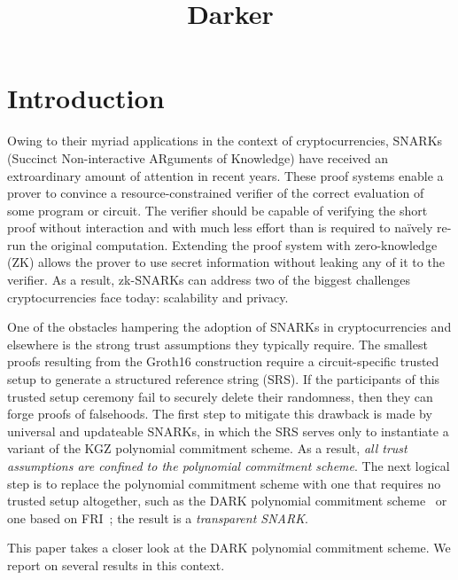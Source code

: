 \documentclass[12pt]{article}
\title{Darker}
\theoremstyle{Definition}
\begin{document}
	
\maketitle
\section{Introduction}
Owing to their myriad applications in the context of cryptocurrencies, SNARKs (Succinct Non-interactive ARguments of Knowledge) have received an extroardinary amount of attention in recent years. These proof systems enable a prover to convince a resource-constrained verifier of the correct evaluation of some program or circuit. The verifier should be capable of verifying the short proof without interaction and with much less effort than is required to naïvely re-run the original computation. Extending the proof system with zero-knowledge (ZK) allows the prover to use secret information without leaking any of it to the verifier. As a result, zk-SNARKs can address two of the biggest challenges cryptocurrencies face today: scalability and privacy.

One of the obstacles hampering the adoption of SNARKs in cryptocurrencies and elsewhere is the strong trust assumptions they typically require. The smallest proofs resulting from the Groth16 construction require a circuit-specific trusted setup to generate a structured reference string (SRS). If the participants of this trusted setup ceremony fail to securely delete their randomness, then they can forge proofs of falsehoods. The first step to mitigate this drawback is made by universal and updateable SNARKs, in which the SRS serves only to instantiate a variant of the KGZ polynomial commitment scheme. As a result, \emph{all trust assumptions are confined to the polynomial commitment scheme}. The next logical step is to replace the polynomial commitment scheme with one that requires no trusted setup altogether, such as the DARK polynomial commitment scheme~\cite{EC:BFS20} or one based on FRI~\cite{}; the result is a \emph{transparent SNARK}.

This paper takes a closer look at the DARK polynomial commitment scheme. We report on several results in this context.
\end{document}
